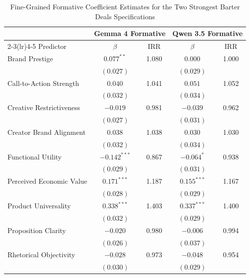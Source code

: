 \begin{table}[htbp]
\centering
\small
\caption{Fine-Grained Formative Coefficient Estimates for the Two Strongest Barter Deals Specifications}
\label{tab:barter_coefficients_selected}
\begin{tabular}{lcccc}
\toprule
 & \multicolumn{2}{c}{Gemma 4 Formative} 
 & \multicolumn{2}{c}{Qwen 3.5 Formative} \\
\cmidrule(lr){2-3}\cmidrule(lr){4-5}
Predictor & $\beta$ & IRR & $\beta$ & IRR \\
\midrule

Brand Prestige              
    & $0.077^{**}$ & 1.080 & $0.000$ & 1.000 \\
    & $(0.027)$   &       & $(0.029)$ &       \\

Call-to-Action Strength     
    & $0.040$ & 1.041 & $0.051$ & 1.052 \\
    & $(0.032)$ &     & $(0.034)$ &     \\

Creative Restrictiveness    
    & $-0.019$ & 0.981 & $-0.039$ & 0.962 \\
    & $(0.027)$ &      & $(0.031)$ &      \\

Creator Brand Alignment     
    & $0.038$ & 1.038 & $0.030$ & 1.030 \\
    & $(0.032)$ &     & $(0.034)$ &     \\

Functional Utility          
    & $-0.142^{***}$ & 0.867 & $-0.064^{*}$ & 0.938 \\
    & $(0.029)$      &       & $(0.031)$    &       \\

Perceived Economic Value    
    & $0.171^{***}$ & 1.187 & $0.155^{***}$ & 1.167 \\
    & $(0.028)$     &       & $(0.029)$     &       \\

Product Universality        
    & $0.338^{***}$ & 1.403 & $0.337^{***}$ & 1.400 \\
    & $(0.032)$     &       & $(0.029)$     &       \\

Proposition Clarity         
    & $-0.020$ & 0.980 & $-0.006$ & 0.994 \\
    & $(0.026)$ &      & $(0.037)$ &      \\

Rhetorical Objectivity      
    & $-0.028$ & 0.973 & $-0.048$ & 0.954 \\
    & $(0.030)$ &      & $(0.029)$ &      \\


\end{tabular}
\end{table}
